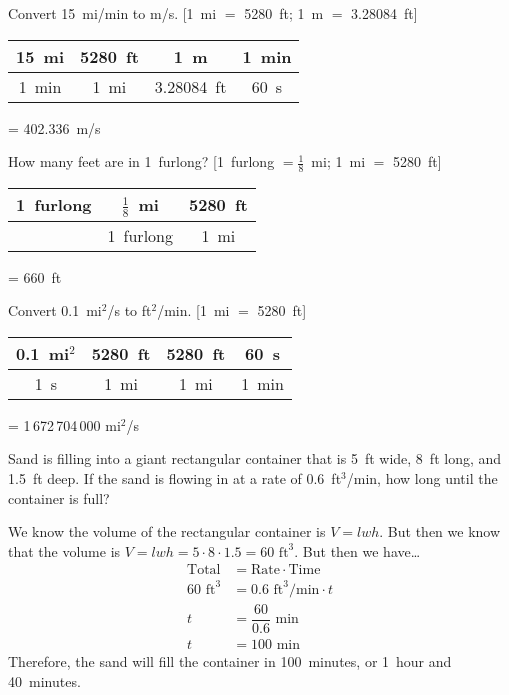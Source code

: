 \documentclass[11pt,letterpaper]{article}
\begin{document}
\newpage



 Convert 15~mi/min to m/s. [1~mi $=$ 5280~ft; 1~m $=$ 3.28084~ft] \pspace

\sol
	\begin{table}[!ht]
	\centering
	\begin{tabular}{c|c|c|c}
	15~mi & 5280~ft & 1~m & 1~min \\ \hline
	1~min & 1~mi & 3.28084~ft & 60~s
	\end{tabular}
	= 402.336~m/s
	\end{table}



\newpage



 How many feet are in 1~furlong? [1~furlong $= \frac{1}{8}$~mi; 1~mi $=$ 5280~ft] \pspace

\sol 
	\begin{table}[!ht]
	\centering
	\begin{tabular}{c|c|c}
	1~furlong & $\frac{1}{8}$~mi & 5280~ft \\ \hline
	 	        & 1~furlong & 1~mi
	\end{tabular}
	= 660~ft
	\end{table}



\newpage



 Convert 0.1~mi$^2$/s to ft$^2$/min. [1~mi $=$ 5280~ft] \pspace

\sol
	\begin{table}[!ht]
	\centering
	\begin{tabular}{c|c|c|c}
	0.1~mi$^2$ & 5280~ft & 5280~ft & 60~s \\ \hline
	1~s & 1~mi & 1~mi & 1~min
	\end{tabular}
	= 1\,672\,704\,000 mi$^2$/s
	\end{table}



\newpage



 Sand is filling into a giant rectangular container that is 5~ft wide, 8~ft long, and 1.5~ft deep. If the sand is flowing in at a rate of 0.6~ft$^3$/min, how long until the container is full? \pspace

\sol We know the volume of the rectangular container is $V= l w h$. But then we know that the volume is $V= lwh= 5 \cdot 8 \cdot 1.5= 60 \text{ ft}^3$. But then we have\dots \pspace
	\[
	\begin{aligned}
	\text{Total}&= \text{Rate} \cdot \text{Time} \\[0.3cm]
	60 \text{ ft}^3&= 0.6 \text{ ft}^3/\text{min} \cdot t \\[0.3cm]
	t&= \dfrac{60}{0.6} \text{ min} \\[0.3cm]
	t&=  100 \text{ min}
	\end{aligned}
	\] \pspace
Therefore, the sand will fill the container in 100~minutes, or 1~hour and 40~minutes. 
\end{document}
